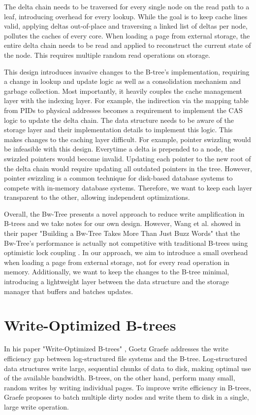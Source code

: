 The delta chain needs to be traversed for every single node on the read path to a leaf, introducing overhead for every lookup.
While the goal is to keep cache lines valid, applying deltas out-of-place and traversing a linked list of deltas per node, pollutes the caches of every core.
When loading a page from external storage, the entire delta chain needs to be read and applied to reconstruct the current state of the node.
This requires multiple random read operations on storage.

This design introduces invasive changes to the B-tree's implementation, requiring a change in lookup and update logic as well as a consolidation mechanism and garbage collection. 
Most importantly, it heavily couples the cache management layer with the indexing layer.
For example, the indirection via the mapping table from \ac{PID}s to physical addresses becomes a requirement to implement the \ac{CAS} logic to update the delta chain.
The data structure needs to be aware of the storage layer and their implementation details to implement this logic.
This makes changes to the caching layer difficult. 
For example, pointer swizzling \cite{graefe2014memory} would be infeasible with this design. 
Everytime a delta is prepended to a node, the swizzled pointers would become invalid.
Updating each pointer to the new root of the delta chain would require updating all outdated pointers in the tree.
However, pointer swizzling is a common technique for disk-based database systems \cite{leis2018leanstore} to compete with in-memory database systems.
Therefore, we want to keep each layer transparent to the other, allowing independent optimizations.

Overall, the Bw-Tree presents a novel approach to reduce write amplification in B-trees and we take notes for our own design.
However, Wang et al. showed in their paper "Building a Bw-Tree Takes More Than Just Buzz Words" \cite{wang2018bwtree} that the Bw-Tree's performance is actually not competitive with traditional B-trees using optimistic lock coupling \cite{leis2019optimistic}.
In our approach, we aim to introduce a small overhead when loading a page from external storage, not for every read operation in memory.
Additionally, we want to keep the changes to the B-tree minimal, introducing a lightweight layer between the data structure and the storage manager that buffers and batches updates.   

\section{Write-Optimized B-trees}
In his paper "Write-Optimized B-trees" \cite{graefe2004write}, Goetz Graefe addresses the write efficiency gap between log-structured file systems and the B-tree.
Log-structured data structures write large, sequential chunks of data to disk, making optimal use of the available bandwidth.
B-trees, on the other hand, perform many small, random writes by writing individual pages.
To improve write efficiency in B-trees, Graefe proposes to batch multiple dirty nodes and write them to disk in a single, large write operation.

